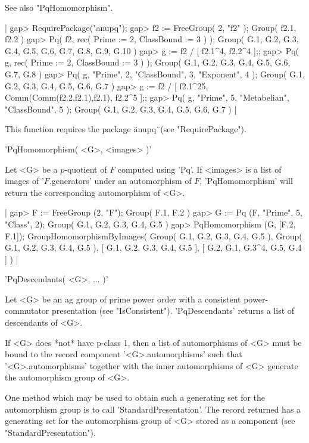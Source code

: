 See also "PqHomomorphism".

|    gap> RequirePackage("anupq");
    gap> f2 := FreeGroup( 2, "f2" );
    Group( f2.1, f2.2 )
    gap> Pq( f2, rec( Prime := 2,  ClassBound := 3 ) );
    Group( G.1, G.2, G.3, G.4, G.5, G.6, G.7, G.8, G.9, G.10 )
    gap> g := f2 / [ f2.1^4, f2.2^4 ];;
    gap> Pq( g, rec( Prime := 2, ClassBound := 3 ) );
    Group( G.1, G.2, G.3, G.4, G.5, G.6, G.7, G.8 )
    gap> Pq( g, "Prime", 2, "ClassBound", 3, "Exponent", 4 );
    Group( G.1, G.2, G.3, G.4, G.5, G.6, G.7 )
    gap> g := f2 / [ f2.1^25, Comm(Comm(f2.2,f2.1),f2.1), f2.2^5 ];;
    gap> Pq( g, "Prime", 5, "Metabelian", "ClassBound", 5 );
    Group( G.1, G.2, G.3, G.4, G.5, G.6, G.7 ) |

This function requires the package \"anupq\"\ (see "RequirePackage").


'PqHomomorphism( <G>, <images> )'

Let <G> be a $p$-quotient of $F$ computed  using  'Pq'. If <images>  is a
list  of  images  of  '$F$.generators'  under  an  automorphism  of  $F$,
'PqHomomorphism' will return the corresponding automorphism of <G>.

|    gap> F := FreeGroup (2, "F");
    Group( F.1, F.2 )
    gap> G := Pq (F, "Prime", 5, "Class", 2);
    Group( G.1, G.2, G.3, G.4, G.5 )
    gap> PqHomomorphism (G, [F.2, F.1]);
    GroupHomomorphismByImages( Group( G.1, G.2, G.3, G.4, G.5 ), Group(
    G.1, G.2, G.3, G.4, G.5 ), [ G.1, G.2, G.3, G.4, G.5 ],
    [ G.2, G.1, G.3^4, G.5, G.4 ] ) |


'PqDescendants( <G>, ... )'

Let  <G>  be  an  ag  group  of  prime  power  order  with  a  consistent
power-commutator  presentation   (see  "IsConsistent").   'PqDescendants'
returns a list of descendants of <G>.

If <G>  does  *not* have p-class 1,  then a list of  automorphisms of <G>
must  be  bound  to the  record  component '<G>.automorphisms' such  that
'<G>.automorphisms' together with the inner automorphisms of <G> generate
the automorphism group of <G>.

One method  which  may be  used  to obtain such a generating set  for the
automorphism  group  is  to  call  'StandardPresentation'.   The record
returned has a generating set for the automorphism group of <G> stored as
a component (see "StandardPresentation").

